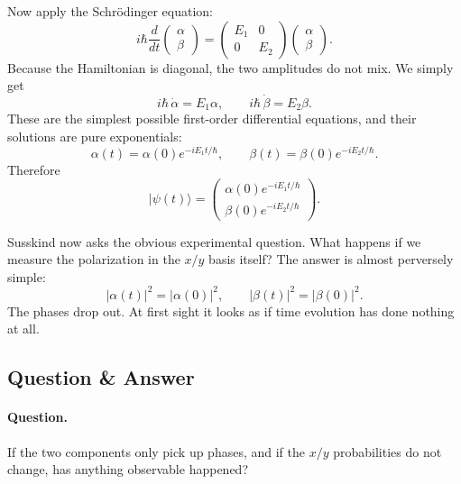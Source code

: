 Now apply the Schr\"odinger equation:
\begin{equation}
i\hbar\frac{d}{dt}
\begin{pmatrix}
\alpha\\
\beta
\end{pmatrix}
=
\begin{pmatrix}
E_1 & 0\\
0 & E_2
\end{pmatrix}
\begin{pmatrix}
\alpha\\
\beta
\end{pmatrix}.
\end{equation}
Because the Hamiltonian is diagonal, the two amplitudes do not mix. We simply get
\begin{equation}
i\hbar\,\dot\alpha=E_1\alpha,
\qquad
i\hbar\,\dot\beta=E_2\beta.
\end{equation}
These are the simplest possible first-order differential equations, and their solutions are pure exponentials:
\begin{equation}
\alpha(t)=\alpha(0)e^{-iE_1 t/\hbar},
\qquad
\beta(t)=\beta(0)e^{-iE_2 t/\hbar}.
\end{equation}
Therefore
\begin{equation}
|\psi(t)\rangle=
\begin{pmatrix}
\alpha(0)e^{-iE_1 t/\hbar}\\
\beta(0)e^{-iE_2 t/\hbar}
\end{pmatrix}.
\end{equation}

Susskind now asks the obvious experimental question. What happens if we measure the polarization in the $x/y$ basis itself? The answer is almost perversely simple:
\begin{equation}
|\alpha(t)|^2=|\alpha(0)|^2,
\qquad
|\beta(t)|^2=|\beta(0)|^2.
\end{equation}
The phases drop out. At first sight it looks as if time evolution has done nothing at all.

\subsection{Question \& Answer}

\paragraph{Question.}
If the two components only pick up phases, and if the $x/y$ probabilities do not change, has anything observable happened?

